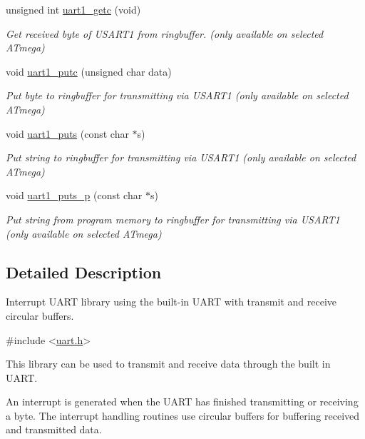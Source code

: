 \begin{DoxyCompactItemize}
unsigned int \hyperlink{group__pfleury__uart_gaeb1405c641e5bc9b7224018f5e8d90de}{uart1\+\_\+getc} (void)
\begin{DoxyCompactList}\small\item\em Get received byte of U\+S\+A\+R\+T1 from ringbuffer. (only available on selected A\+Tmega) \end{DoxyCompactList}\item 
void \hyperlink{group__pfleury__uart_gab465f689d197fadfbacc374fc9411154}{uart1\+\_\+putc} (unsigned char data)
\begin{DoxyCompactList}\small\item\em Put byte to ringbuffer for transmitting via U\+S\+A\+R\+T1 (only available on selected A\+Tmega) \end{DoxyCompactList}\item 
void \hyperlink{group__pfleury__uart_ga5568f8f3913b218fd4d0346af78831b2}{uart1\+\_\+puts} (const char $\ast$s)
\begin{DoxyCompactList}\small\item\em Put string to ringbuffer for transmitting via U\+S\+A\+R\+T1 (only available on selected A\+Tmega) \end{DoxyCompactList}\item 
void \hyperlink{group__pfleury__uart_ga1e8074d0a2d5922601c5db2f9777ba79}{uart1\+\_\+puts\+\_\+p} (const char $\ast$s)
\begin{DoxyCompactList}\small\item\em Put string from program memory to ringbuffer for transmitting via U\+S\+A\+R\+T1 (only available on selected A\+Tmega) \end{DoxyCompactList}\end{DoxyCompactItemize}


\subsection{Detailed Description}
Interrupt U\+A\+RT library using the built-\/in U\+A\+RT with transmit and receive circular buffers. 


\begin{DoxyCode}
\textcolor{preprocessor}{#include <\hyperlink{uart_8h}{uart.h}>} 
\end{DoxyCode}


This library can be used to transmit and receive data through the built in U\+A\+RT.

An interrupt is generated when the U\+A\+RT has finished transmitting or receiving a byte. The interrupt handling routines use circular buffers for buffering received and transmitted data.

